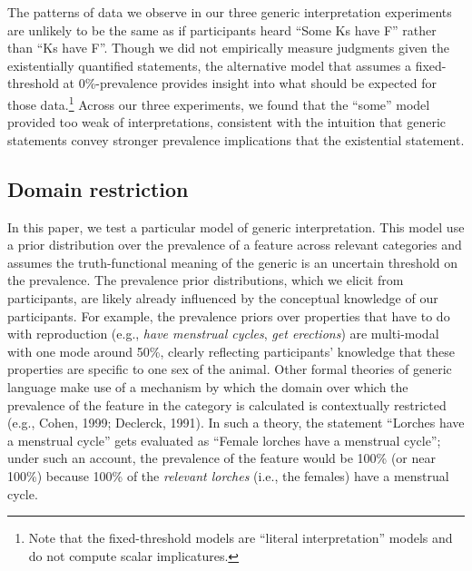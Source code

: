 \documentclass[floatsintext,doc]{apa6}
\theoremstyle{definition}
\theoremstyle{definition}
\theoremstyle{definition}
\theoremstyle{remark}
\begin{document}
The patterns of data we observe in our three generic interpretation
experiments are unlikely to be the same as if participants heard
\enquote{Some Ks have F} rather than \enquote{Ks have F}. Though we did
not empirically measure judgments given the existentially quantified
statements, the alternative model that assumes a fixed-threshold at
0\%-prevalence provides insight into what should be expected for those
data.\footnote{Note that the fixed-threshold models are \enquote{literal
  interpretation} models and do not compute scalar implicatures.} Across
our three experiments, we found that the \enquote{some} model provided
too weak of interpretations, consistent with the intuition that generic
statements convey stronger prevalence implications that the existential
statement.


\subsection{Domain restriction}\label{domain-restriction}

In this paper, we test a particular model of generic interpretation.
This model use a prior distribution over the prevalence of a feature
across relevant categories and assumes the truth-functional meaning of
the generic is an uncertain threshold on the prevalence. The prevalence
prior distributions, which we elicit from participants, are likely
already influenced by the conceptual knowledge of our participants. For
example, the prevalence priors over properties that have to do with
reproduction (e.g., \emph{have menstrual cycles}, \emph{get erections})
are multi-modal with one mode around 50\%, clearly reflecting
participants' knowledge that these properties are specific to one sex of
the animal. Other formal theories of generic language make use of a
mechanism by which the domain over which the prevalence of the feature
in the category is calculated is contextually restricted (e.g., Cohen,
1999; Declerck, 1991). In such a theory, the statement \enquote{Lorches
have a menstrual cycle} gets evaluated as \enquote{Female lorches have a
menstrual cycle}; under such an account, the prevalence of the feature
would be 100\% (or near 100\%) because 100\% of the \emph{relevant
lorches} (i.e., the females) have a menstrual cycle.
\end{document}
